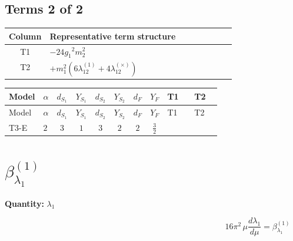 \documentclass[8pt]{article}
\begin{document}
\begin{landscape}
\subsection*{Terms 2 of 2}
\begin{center}
\begin{tabular}{@{}c >{\raggedright\arraybackslash}p{0.82\linewidth}@{}}
\toprule
Column & Representative term structure \\
\midrule
T1 & \(\displaystyle -24 {g_1}^2 {m_2^2}\) \\
\midrule
T2 & \(\displaystyle +{m_1^2} (6 {\lambda_{12}^{(1)}}+4 {\lambda_{12}^{(\times)}})\) \\
\midrule
\bottomrule
\end{tabular}
\end{center}
\smallskip
\tiny
\begin{longtable}{@{}llcccccc >{\raggedright\arraybackslash}p{0.21\linewidth} >{\raggedright\arraybackslash}p{0.21\linewidth}@{}}
\toprule
Model & $\alpha$ & $d_{S_1}$ & $Y_{S_1}$ & $d_{S_2}$ & $Y_{S_2}$ & $d_F$ & $Y_F$ & T1 & T2 \\
\midrule
\endfirsthead
\toprule
Model & $\alpha$ & $d_{S_1}$ & $Y_{S_1}$ & $d_{S_2}$ & $Y_{S_2}$ & $d_F$ & $Y_F$ & T1 & T2 \\
\midrule
\endhead
T3-E & $2$ & $3$ & $1$ & $3$ & $2$ & $2$ & $\frac{3}{2}$ & \scriptsize\adjustbox{max width=\linewidth}{$\begin{gathered} -24 {g_1}^2 {m_2^2}\end{gathered}$} & \scriptsize\adjustbox{max width=\linewidth}{$\begin{gathered} +{m_1^2} (6 {\lambda_{12}^{(1)}}+4 {\lambda_{12}^{(\times)}})\end{gathered}$} \\
\midrule
\bottomrule
\end{longtable}
\clearpage
\section*{$\beta_{\lambda_1}^{(1)}$}
\noindent\textbf{Quantity: }$\lambda_1$\par\smallskip
\[16\pi^2\,\mu\frac{d \lambda_1}{d\mu}=\beta_{\lambda_1}^{(1)}\]

\end{landscape}
\end{document}
